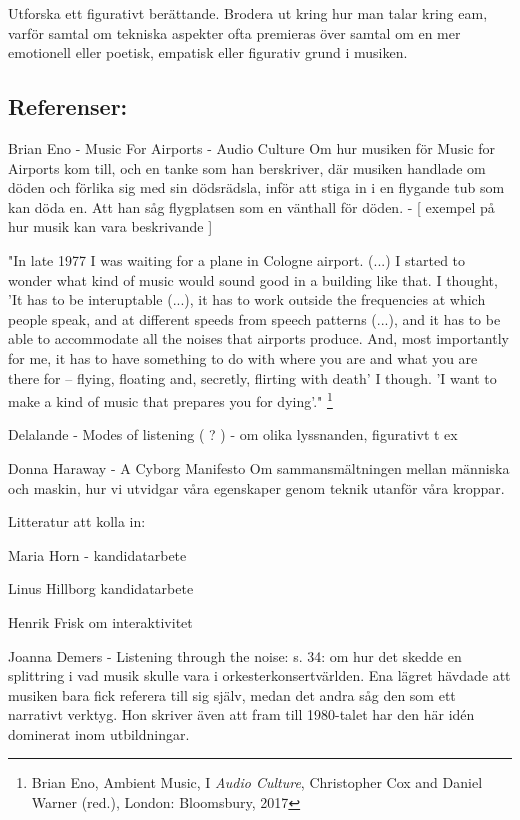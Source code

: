 \documentclass{article}
\begin{document}
Utforska ett figurativt berättande. Brodera ut kring hur man talar kring eam, varför samtal om tekniska
aspekter ofta premieras över samtal om en mer emotionell eller poetisk, empatisk eller figurativ grund i
musiken. 


\subsection{Referenser:}

Brian Eno - Music For Airports - Audio Culture
	Om hur musiken för Music for Airports kom till, och en tanke som han berskriver, där musiken handlade om
	döden och förlika sig med sin dödsrädsla, inför att stiga in i en flygande tub som kan döda en. Att han
	såg flygplatsen som en vänthall för döden. - [ exempel på hur musik kan vara beskrivande ]
	

	"In late 1977 I was waiting for a plane in Cologne airport. (...) I started to wonder what kind of music
	would sound good in a building like that. I thought, 'It has to be interuptable (...), it has to work
	outside the frequencies at which people speak, and at different speeds from speech patterns (...), and it
	has to be able to accommodate all the noises that airports produce. And, most importantly for me, it has
	to have something to do with where you are and what you are there for -- flying, floating and, secretly,
	flirting with death' I though. 'I want to make a kind of music that prepares you for dying'."
	\footnote{Brian Eno, Ambient Music, I \emph{Audio Culture}, Christopher Cox and Daniel Warner (red.),
	London: Bloomsbury, 2017}



Delalande - Modes of listening ( ? ) - om olika lyssnanden, figurativt t ex

Donna Haraway - A Cyborg Manifesto
	Om sammansmältningen mellan människa och maskin, hur vi utvidgar våra egenskaper genom teknik utanför våra
	kroppar. 

Litteratur att kolla in:

Maria Horn - kandidatarbete

Linus Hillborg kandidatarbete

Henrik Frisk om interaktivitet

Joanna Demers - Listening through the noise:
	s. 34: om hur det skedde en splittring i vad musik skulle vara i orkesterkonsertvärlden. Ena lägret
	hävdade att musiken bara fick referera till sig själv, medan det andra såg den som ett narrativt verktyg.
	Hon skriver även att fram till 1980-talet har den här idén dominerat inom utbildningar.  
	
\end{document}
